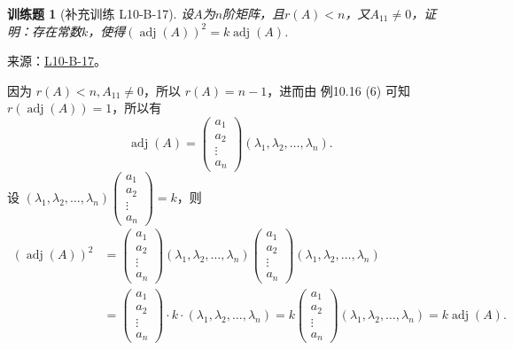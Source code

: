 \documentclass[UTF8,12pt,a4paper,fontset=fandol]{ctexart}
\newtheorem{exercise}{训练题}[section]
\begin{document}
\begin{exercise}[补充训练 L10-B-17]\label{prob:L10-B-17}
设$A$为$n$阶矩阵，且$r(A) < n$，又$A_{11} \neq 0$，证明：存在常数$k$，使得$(\operatorname{adj}(A))^2=k\operatorname{adj}(A)$.
\end{exercise}
\noindent 来源：\href{https://github.com/yhwu-is/Linear-Algebra-Left-Undone/blob/new/%E8%AE%B2%E4%B9%89/%E4%B8%93%E9%A2%98/10%20%E8%A1%8C%E5%88%97%E5%BC%8F.tex}{L10-B-17}。
\begin{solve}
因为 $r(A) < n, A_{11} \neq 0$，所以 $r(A) = n-1$，进而由 {例10.16 (6)} 可知 $r(\operatorname{adj}(A)) = 1$，所以有 
            \[\operatorname{adj}(A) = \begin{pmatrix} a_1 \\ a_2 \\ \vdots \\ a_n \end{pmatrix} (\lambda_1, \lambda_2, \ldots, \lambda_n).\]
            设 $(\lambda_1, \lambda_2, \ldots, \lambda_n) \begin{pmatrix} a_1 \\ a_2 \\ \vdots \\ a_n \end{pmatrix} = k$，则
            \begin{align*}
                (\operatorname{adj}(A))^2 & = \begin{pmatrix}a_1 \\ a_2 \\ \vdots \\ a_n \end{pmatrix}
                (\lambda_1, \lambda_2, \ldots, \lambda_n)
                \begin{pmatrix} a_1 \\ a_2 \\ \vdots \\ a_n \end{pmatrix}
                (\lambda_1, \lambda_2, \ldots, \lambda_n)                                     \\
                        & = \begin{pmatrix} a_1 \\ a_2 \\ \vdots \\ a_n \end{pmatrix} \cdot k
                \cdot (\lambda_1, \lambda_2, \ldots, \lambda_n) = k
                \begin{pmatrix} a_1 \\ a_2 \\ \vdots \\ a_n \end{pmatrix}
                (\lambda_1, \lambda_2, \ldots, \lambda_n) = k\operatorname{adj}(A).
            \end{align*}
\end{solve}
\end{document}

